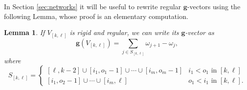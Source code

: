 \documentclass[12pt]{amsart}
\newcommand{\sayHW}[1]{\say[HW]{\color{violet}{\bf HW:}\;#1}}
\newcommand{\sayDR}[1]{\say[DR]{\color{red}{\bf DR:}\;#1}}
\newcommand{\ZZ}{\mathbb{Z}}
\newcommand{\bfg}{\mathbf{g}}
\newcommand{\cE}{\mathcal{E}}
\DeclareMathOperator{\coind}{coind}
\newtheorem{lemma}[theorem]{Lemma}
\theoremstyle{remark}
\numberwithin{equation}{section}
\numberwithin{figure}{section}
\begin{document}


In Section \ref{sec:networks} it will be useful to rewrite regular $\bfg$-vectors using the following Lemma, whose proof is an elementary computation.

\begin{lemma}\label{lem:regulargvectors}
If $V_{[k,\ell]}$ is rigid and regular, we can write its $\bfg$-vector as
\[
\bfg(V_{[k,\ell]})=\sum_{j\in S_{[k,\ell]}} \omega_{j+1} - \omega_j,
\]
where 
\[
S_{[k,\ell]} = \begin{cases} [\ell,k-2] \cup [i_1, o_1 -1] \cup \cdots \cup [i_m, o_m - 1] & \text{$i_1<o_1$ in $[k,\ell]$}\\ [i_1,o_2-1] \cup \cdots \cup [i_m,\ell] & \text{$o_1 < i_1$ in $[k,\ell]$.}\end{cases}
\]
\end{lemma}
\end{document}
